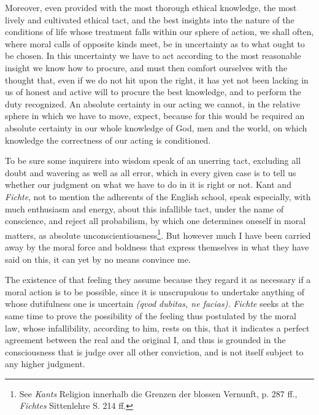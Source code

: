 \documentclass[12pt,a4paper,openany]{book}
\newcommand{\opage}[1]{\marginnote{\footnotesize\textit{[#1]}}}
\begin{document}
Moreover, even provided with the most thorough ethical knowledge, the most lively and
cultivated ethical tact, and the best insights into the nature of the conditions of
life whose treatment falls within our sphere of action, we shall often, where moral
calls of opposite kinds meet, be in uncertainty as to what ought to be chosen. In
this uncertainty we have to act according to the most reasonable insight we know how
to procure, and must then comfort ourselves with the thought that, even if we do not
hit upon the right, it has yet not been lacking in us of honest and active will to
procure the best knowledge, and to perform the duty recognized. An absolute certainty
in our acting we cannot, in the relative sphere in which we have to move, expect,
because for this would be required an absolute certainty in our whole knowledge of
God, men and the world, on which knowledge the correctness of our acting is
conditioned.

To be sure some inquirers into wisdom speak of an unerring tact, excluding all doubt
and wavering as well as all error, which in every given case is to tell us whether
our judgment on what we have to do in it is right or not. Kant and \emph{Fichte}, not
to mention the adherents of the English school, speak especially, with much
enthusiasm and energy, about
\setcounter{footnote}{0}%
\opage{93}this infallible tact, under the name of conscience, and reject all probabilism,
by which one determines oneself in moral matters, as absolute
unconscientiousness\footnote[1]{See \emph{Kants} Religion innerhalb die Grenzen der blossen Vernunft, p. 287 ff., \emph{Fichtes} Sittenlehre S. 214 ff.}. But however much I have been carried away by the moral force and boldness that express
themselves in what they have said on this, it can yet by no means convince me.

The existence of that feeling they assume because they regard it as necessary if a
moral action is to be possible, since it is unscrupulous to undertake anything of
whose dutifulness one is uncertain \textit{(qvod dubitas, ne facias).} \emph{Fichte}
seeks at the same time to prove the possibility of the feeling thus postulated by the
moral law, whose infallibility, according to him, rests on this, that it indicates a
perfect agreement between the real and the original I, and thus is grounded in the
consciousness that is judge over all other conviction, and is not itself subject to
any higher judgment.
\end{document}
